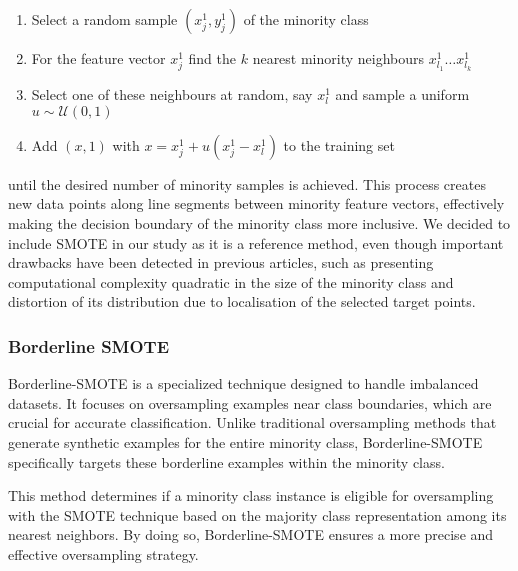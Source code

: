 \begin{enumerate}[label=(\roman*)]
\item Select a random sample $(x_j^1, y_j^1)$ of the minority class
\item For the feature vector $x_j^1$ find the $k$ nearest minority neighbours $x_{l_1}^1 \dots x_{l_k}^1$
\item Select one of these neighbours at random, say $x_{l}^1$ and sample a uniform $u \sim \mathcal{U}(0,1)$
\item Add $(x, 1)$ with $x = x_j^1 + u (x_j^1 - x_l^1)$ to the training set
\end{enumerate}

until the desired number of minority samples is achieved.
This process creates new data points along line segments between minority feature vectors, effectively making the decision boundary of the minority class more inclusive. 
We decided to include SMOTE in our study as it is a reference method, even though important drawbacks have been detected in previous articles, 
such as presenting computational complexity quadratic in the size of the minority class and distortion of its distribution due to localisation of the selected target points.



\begin{comment}
	\begin{figure}[H]
	\label{fig:tube}
	\centering
	\texttt{[image: tube.jpg]}
	\caption{Conservation in thin long tube (3D), with variables varying only in one dimension (from C.P. Fall, 2005)}
	\end{figure}
\end{comment}


\subsubsection{Borderline SMOTE}

Borderline-SMOTE is a specialized technique designed to handle imbalanced datasets. It focuses on oversampling examples near class boundaries, which are crucial for accurate classification. Unlike traditional oversampling methods that generate synthetic examples for the entire minority class, Borderline-SMOTE specifically targets these borderline examples within the minority class.

This method determines if a minority class instance is eligible for oversampling with the SMOTE technique based on the majority class representation among its nearest neighbors. By doing so, Borderline-SMOTE ensures a more precise and effective oversampling strategy.

